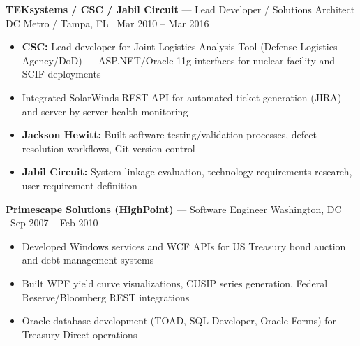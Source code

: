 \documentclass[10pt,letterpaper]{article}
\begin{document}
\textbf{TEKsystems / CSC / Jabil Circuit} --- Lead Developer / Solutions Architect \hfill DC Metro / Tampa, FL \textbullet\ Mar 2010 -- Mar 2016
\begin{itemize}
    \item \textbf{CSC:} Lead developer for Joint Logistics Analysis Tool (Defense Logistics Agency/DoD) --- ASP.NET/Oracle 11g interfaces for nuclear facility and SCIF deployments
    \item Integrated SolarWinds REST API for automated ticket generation (JIRA) and server-by-server health monitoring
    \item \textbf{Jackson Hewitt:} Built software testing/validation processes, defect resolution workflows, Git version control
    \item \textbf{Jabil Circuit:} System linkage evaluation, technology requirements research, user requirement definition
\end{itemize}

\textbf{Primescape Solutions (HighPoint)} --- Software Engineer \hfill Washington, DC \textbullet\ Sep 2007 -- Feb 2010
\begin{itemize}
    \item Developed Windows services and WCF APIs for US Treasury bond auction and debt management systems
    \item Built WPF yield curve visualizations, CUSIP series generation, Federal Reserve/Bloomberg REST integrations
    \item Oracle database development (TOAD, SQL Developer, Oracle Forms) for Treasury Direct operations
\end{itemize}
\end{document}
